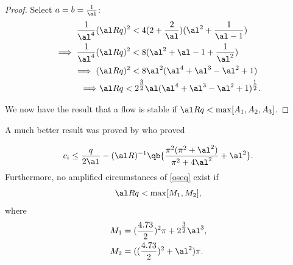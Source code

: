 \begin{proof}
    Select $ a = b = \frac{1}{\al}$:
    \begin{align}
        \frac{1}{\al^4} (&\al R q)^2 < 4 (2 + \frac{2}{\al})(\al^2 + \frac{1}{\al - 1}) \nonumber\\
        \implies \frac{1}{\al^4} (&\al R q)^2 < 8 (\al^2 + \al - 1 + \frac{1}{\al^2}) \nonumber\\
        \implies (&\al R q)^2 < 8 \al^2 (\al^4 + \al^3 - \al^2 + 1) \nonumber\\
        \implies &\al R q < 2^{\tfrac{3}{2}} \al (\al^4 + \al^3 - \al^2 + 1)^{\tfrac{1}{2}}.
    \end{align}

    We now have the result that a flow is stable if $ \al R q < \max[A_1, A_2, A_3]$.
\end{proof}

A much better result was proved by \citet{joseph1968eigenvalue, joseph1969eigenvalue} who proved

\begin{theorem}
\begin{equation}
    c_i \leq \frac{q}{2 \al} - (\al R)^{-1} \qb{\frac{\pi^2 (\pi^2 + \al^2)}{\pi^2 + 4 \al^2} + \al^2}.
\end{equation}
Furthermore, no amplified circumstances of \eqref{oseq} exist if
\begin{equation}
    \al R q < \max[M_1, M_2],
\end{equation}
where
\begin{align}
    M_1 &= (\frac{4.73}{2})^2 \pi + 2^{\tfrac{3}{2}} \al^3, \nonumber\\
    M_2 &= ((\frac{4.73}{2})^2 + \al^2) \pi.
    \label{jbound}
\end{align}
\end{theorem}

